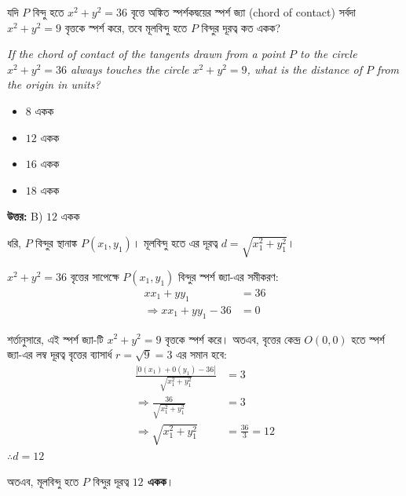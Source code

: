 \documentclass[12pt, a4paper]{article}
\begin{document}
\begin{tcolorbox}[questionbox={প্রশ্ন (Question) 29}]
    \noindent
    যদি $P$ বিন্দু হতে $x^2 + y^2 = 36$ বৃত্তে অঙ্কিত স্পর্শকদ্বয়ের স্পর্শ জ্যা (chord of contact) সর্বদা $x^2 + y^2 = 9$ বৃত্তকে স্পর্শ করে, তবে মূলবিন্দু হতে $P$ বিন্দুর দূরত্ব কত একক?
    
    \vspace{0.8em}
    \begin{english}
    \noindent\textit{\color{darkgray}
    If the chord of contact of the tangents drawn from a point $P$ to the circle $x^2 + y^2 = 36$ always touches the circle $x^2 + y^2 = 9$, what is the distance of $P$ from the origin in units?
    }
    \end{english}
\end{tcolorbox}

\vspace{1em}
\begin{itemize}[label={}, leftmargin=1cm, itemsep=0.5em]
    \item[\textbf{A)}] $8$ একক
    \item[\textbf{B)}] $12$ একক
    \item[\textbf{C)}] $16$ একক
    \item[\textbf{D)}] $18$ একক
\end{itemize}

\vspace{0.5em}
\begin{tcolorbox}[answerbox]
    \textbf{\color{success} উত্তর:} B) $12$ একক
\end{tcolorbox}
\vspace{1em}

\begin{tcolorbox}[solutionbox={সমাধান (Solution)}]
    \noindent
    ধরি, $P$ বিন্দুর স্থানাঙ্ক $P(x_1, y_1)$। 
    মূলবিন্দু হতে এর দূরত্ব $d = \sqrt{x_1^2 + y_1^2}$। 
    
    $x^2 + y^2 = 36$ বৃত্তের সাপেক্ষে $P(x_1, y_1)$ বিন্দুর স্পর্শ জ্যা-এর সমীকরণ:
    \begin{align*}
        xx_1 + yy_1 &= 36 \\
        \Rightarrow xx_1 + yy_1 - 36 &= 0
    \end{align*}
    
    শর্তানুসারে, এই স্পর্শ জ্যা-টি $x^2 + y^2 = 9$ বৃত্তকে স্পর্শ করে। 
    অতএব, বৃত্তের কেন্দ্র $O(0, 0)$ হতে স্পর্শ জ্যা-এর লম্ব দূরত্ব বৃত্তের ব্যাসার্ধ $r = \sqrt{9} = 3$ এর সমান হবে:
    \begin{align*}
        \frac{|0(x_1) + 0(y_1) - 36|}{\sqrt{x_1^2 + y_1^2}} &= 3 \\
        \Rightarrow \frac{36}{\sqrt{x_1^2 + y_1^2}} &= 3 \\
        \Rightarrow \sqrt{x_1^2 + y_1^2} &= \frac{36}{3} = 12
    \end{align*}
    $\therefore d = 12$ 
    
    অতএব, মূলবিন্দু হতে $P$ বিন্দুর দূরত্ব \textbf{$12$ একক}।
\end{tcolorbox}
\end{document}
